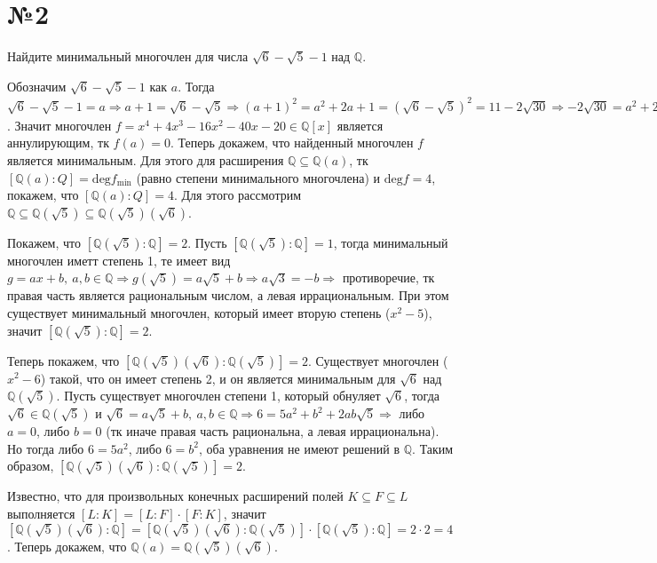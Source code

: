\documentclass[a4paper, 16pt]{article}
\newcommand{\Q} {\mathbb{Q}}
\newenvironment{solution}[1][Решение]{%
	\begin{trivlist}
		\item[\hskip \labelsep {\bfseries #1:}]
		\item \hspace{15pt}
	}{
	\end{trivlist}
}
\begin{document}
	\section*{№2}
	
		Найдите минимальный многочлен для числа $\sqrt{6} - \sqrt{5}-1$ над $\Q$.
		
		\begin{solution}
			Обозначим $\sqrt{6} - \sqrt{5}-1$ как $a$. Тогда  $\sqrt{6} - \sqrt{5}-1 = a \Rightarrow a + 1 = \sqrt{6} - \sqrt{5} \Rightarrow 
			(a + 1)^2 = a^2 + 2a + 1 = (\sqrt{6} - \sqrt{5})^2 = 11 -2 \sqrt{30} \Rightarrow -2\sqrt{30} = a^2 + 2a - 10 \Rightarrow 120 = (a^2 + 2a - 10)^2 = a^4 + 4a^3 - 16a^2 - 40a+100 \Rightarrow a^4 + 4a^3 - 16a^2 - 40a - 20 = 0$. Значит многочлен $f = x^4 + 4x^3 - 16x^2 - 40x - 20 \in \Q[x]$ является аннулирующим, тк $f(a) = 0$. Теперь докажем, что найденный многочлен $f$ является минимальным. Для этого для расширения $\Q \subseteq \Q(a)$, тк $[\Q(a) : Q] = \text{deg}f_{\text{min}}$ (равно степени минимального многочлена) и $\text{deg}f = 4$, покажем, что $[\Q(a) : Q] = 4$. Для этого рассмотрим $\Q \subseteq \Q(\sqrt{5}) \subseteq \Q(\sqrt{5})(\sqrt{6})$. 
			
			Покажем, что 
			$[\Q(\sqrt{5}) : \Q] = 2$. Пусть $[\Q(\sqrt{5}) : \Q] = 1$, тогда минимальный многочлен иметт степень 1, те имеет вид $g = ax + b, \ a, b \in \Q \Rightarrow g(\sqrt{5}) = a \sqrt{5} + b \Rightarrow a\sqrt{3} = -b \Rightarrow$ противоречие, тк правая часть является рациональным числом, а левая иррациональным. При этом существует минимальный многочлен, который имеет вторую степень ($x^2 - 5$), значит $[\Q(\sqrt{5}) : \Q] = 2$.
			
			Теперь покажем, что $[\Q(\sqrt{5})(\sqrt{6}) : \Q(\sqrt{5})] = 2$.
			Существует многочлен ($x^2 - 6$) такой, что он имеет степень 2, и он является минимальным для $\sqrt{6}$ над $\Q(\sqrt{5})$.
			Пусть существует многочлен степени 1, который обнуляет $\sqrt{6}$, тогда $\sqrt{6} \in \Q(\sqrt{5})$ и $\sqrt{6} = a\sqrt{5} + b, \ a, b \in \Q \Rightarrow 6 = 5a^2 + b^2 + 2ab\sqrt{5} \Rightarrow$ либо $a = 0$, либо $b = 0$ (тк иначе правая часть рациональна, а левая иррациональна). Но тогда либо $6 = 5a^2$, либо $6 = b^2$, оба уравнения не имеют решений в $\Q$. Таким образом, $[\Q(\sqrt{5})(\sqrt{6}) : \Q(\sqrt{5})] = 2$.
			
			Известно, что для произвольных конечных расширений полей $K \subseteq F \subseteq L$ выполняется $[L : K] = [L : F] \cdot [F : K]$, значит  $[\Q(\sqrt{5})(\sqrt{6}) : \Q] = [\Q(\sqrt{5})(\sqrt{6}) : \Q(\sqrt{5})] \cdot [\Q(\sqrt{5}) : \Q] = 2 \cdot 2 = 4$. Теперь докажем, что $\Q(a) = \Q(\sqrt{5})(\sqrt{6})$.
			

\end{solution}
\end{document}
